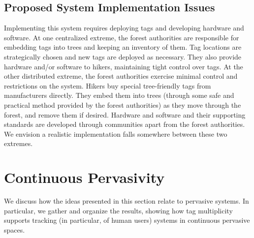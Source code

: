 \subsection{Proposed System Implementation Issues}
Implementing this system requires deploying tags and developing hardware and software.  At one centralized extreme, the forest authorities are responsible for embedding tags into trees and keeping an inventory of them.  Tag locations are strategically chosen and new tags are deployed as necessary.  They also provide hardware and/or software to hikers, maintaining tight control over tags.  At the other distributed extreme, the forest authorities exercise minimal control and restrictions on the system.  Hikers buy special tree-friendly tags from manufacturers directly.  They embed them into trees (through some safe and practical method provided by the forest authorities) as they move through the forest, and remove them if desired.  Hardware and software and their supporting standards are developed through communities apart from the forest authorities.  We envision a realistic implementation falls somewhere between these two extremes. 

\section{Continuous Pervasivity}
\label{Section: Tracking Protocols: Continuous Pervasivity}
We discuss how the ideas presented in this section relate to pervasive systems. In particular, we gather and organize the results, showing how tag multiplicity supports tracking (in particular, of human users) systems in continuous pervasive spaces.

